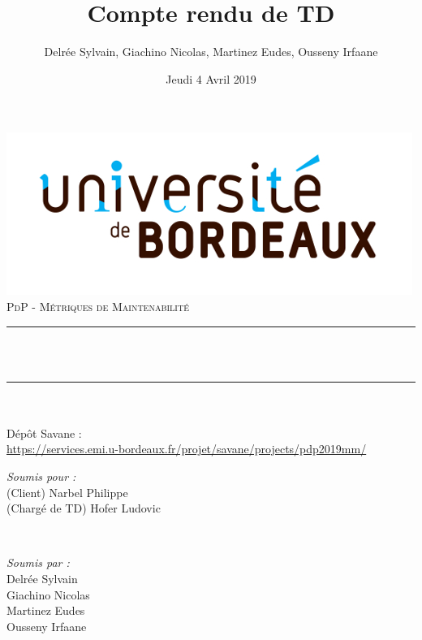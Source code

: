 \documentclass{scrartcl}
\title{Compte rendu de TD}
\author{Delrée Sylvain, Giachino Nicolas, Martinez Eudes, Ousseny Irfaane}
\date{Jeudi 4 Avril 2019}
\makeatletter
\let\thetitle\@title
\let\thedate\@date
\makeatother
\begin{document}
\begin{titlepage}
    \centering
    \vspace*{0.5 cm}
    \includegraphics[scale = 0.5]{img/logo.jpg}\\[1.0 cm]
    \textsc{\LARGE PdP - Métriques de Maintenabilité}\\[1.0 cm]
    \rule{\linewidth}{0.2 mm} \\[0.4 cm]
    { \huge \bfseries \thetitle}\\
    \rule{\linewidth}{0.2 mm} \\[0.5 cm]
    {\small \thedate}\\[0.5 cm]
    {\small Dépôt Savane :\\ \url{https://services.emi.u-bordeaux.fr/projet/savane/projects/pdp2019mm/}}\\[1.5 cm]
    
    \begin{minipage}{0.4\textwidth}
        \begin{flushleft} \large
            \emph{Soumis pour :}\\
            (Client) Narbel Philippe\\
            (Chargé de TD) Hofer Ludovic\\
        \end{flushleft}
    \end{minipage}~
    \begin{minipage}{0.4\textwidth}
        \begin{flushright} \large
            \emph{Soumis par :} \\
            Delrée Sylvain\\
            Giachino Nicolas\\
            Martinez Eudes\\
            Ousseny Irfaane\\
        \end{flushright}
    \end{minipage}\\[2 cm]
    
\end{titlepage}
\end{document}
